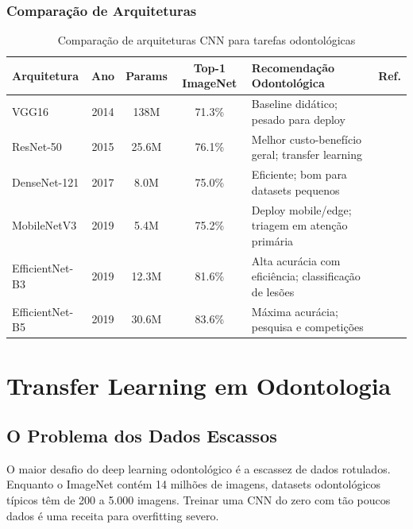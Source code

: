 \subsubsection{Comparação de Arquiteturas}

\begin{table}[H]
  \centering
  \caption{Comparação de arquiteturas CNN para tarefas odontológicas}
  \label{tab:cnn-comparison}
  \begin{tabularx}{\textwidth}{lccclX}
    \toprule
    \textbf{Arquitetura} & \textbf{Ano} & \textbf{Params} & \textbf{Top-1 ImageNet} & \textbf{Recomendação Odontológica} & \textbf{Ref.} \\
    \midrule
    VGG16 & 2014 & 138M & 71.3\% & Baseline didático; pesado para deploy & \cite{DL-ODT-001} \\
    ResNet-50 & 2015 & 25.6M & 76.1\% & Melhor custo-benefício geral; transfer learning & \cite{ODT-026} \\
    DenseNet-121 & 2017 & 8.0M & 75.0\% & Eficiente; bom para datasets pequenos & \cite{ODT-021} \\
    MobileNetV3 & 2019 & 5.4M & 75.2\% & Deploy mobile/edge; triagem em atenção primária & \cite{ODT-022} \\
    EfficientNet-B3 & 2019 & 12.3M & 81.6\% & Alta acurácia com eficiência; classificação de lesões & \cite{ODT-011} \\
    EfficientNet-B5 & 2019 & 30.6M & 83.6\% & Máxima acurácia; pesquisa e competições & \cite{ODT-013} \\
    \bottomrule
  \end{tabularx}
\end{table}

\section{Transfer Learning em Odontologia}
\label{sec:transfer-learning}

\subsection{O Problema dos Dados Escassos}

O maior desafio do deep learning odontológico é a escassez de dados rotulados.
Enquanto o ImageNet contém 14 milhões de imagens, datasets odontológicos típicos
têm de 200 a 5.000 imagens. Treinar uma CNN do zero com tão poucos dados é uma
receita para overfitting severo.

